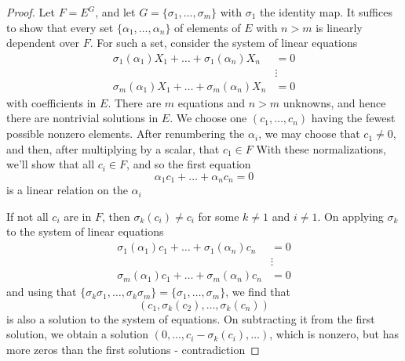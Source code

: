\documentclass[11pt]{article}
\begin{document}
\begin{proof}
Let \(F=E^G\), and let \(G=\{\sigma_1,\dots,\sigma_m\}\) with \(\sigma_1\) the identity map. It suffices to show that
every set \(\{\alpha_1,\dots,\alpha_n\}\) of elements of \(E\) with \(n>m\) is linearly dependent over \(F\). For
such a set, consider the system of linear equations
\begin{align*}
\sigma_1(\alpha_1)X_1+\dots+\sigma_1(\alpha_n)X_n&=0\\
&\vdots\\
\sigma_m(\alpha_1)X_1+\dots+\sigma_m(\alpha_n)X_n&=0
\end{align*}
with coefficients in \(E\). There are \(m\) equations and \(n>m\) unknowns, and hence there are
nontrivial solutions in \(E\). We choose one \((c_1,\dots,c_n)\) having the fewest possible nonzero
elements. After renumbering the \(\alpha_i\), we may choose that \(c_1\neq 0\), and then, after
multiplying by a scalar, that \(c_1\in F\)
With these normalizations, we'll show that
all \(c_i\in F\), and so the first equation
\begin{equation*}
\alpha_1c_1+\dots+\alpha_nc_n=0
\end{equation*}
is a linear relation on the \(\alpha_i\)

If not all \(c_i\) are in \(F\), then \(\sigma_k(c_i)\neq c_i\) for some \(k\neq 1\) and \(i\neq 1\). On
applying \(\sigma_k\) to the system of linear equations
\begin{align*}
\sigma_1(\alpha_1)c_1+\dots+\sigma_1(\alpha_n)c_n&=0\\
&\vdots\\
\sigma_m(\alpha_1)c_1+\dots+\sigma_m(\alpha_n)c_n&=0
\end{align*}
and using that \(\{\sigma_k\sigma_1,\dots,\sigma_k\sigma_m\}=\{\sigma_1,\dots,\sigma_m\}\), we find that
\begin{equation*}
(c_1,\sigma_k(c_2),\dots,\sigma_k(c_n))
\end{equation*}
is also a solution to the system of equations. On subtracting it from the first solution, we
obtain a solution \((0,\dots,c_i-\sigma_k(c_i),\dots)\), which is nonzero, but has more zeros than the first
solutions - contradiction
\end{proof}
\end{document}
